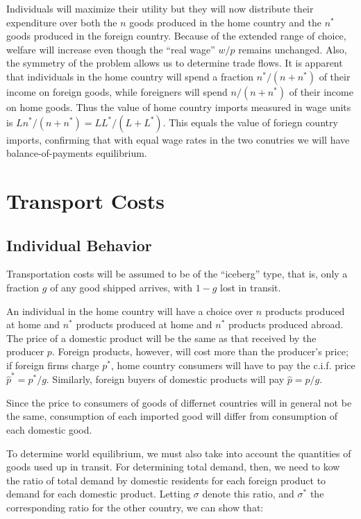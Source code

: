 Individuals will maximize their utility but they will now distribute their expenditure over both the $n$ goods produced in the home country and the $n^*$ goods produced in the foreign country. Because of the extended range of choice, welfare will increase even though the ``real wage'' $w/p$ remains unchanged. Also, the symmetry of the problem allows us to determine trade flows. It is apparent that individuals in the home country will spend a fraction $n^* / (n + n^*)$ of their income on foreign goods, while foreigners will spend $n/(n + n^*)$ of their income on home goods. Thus the value of home country imports measured in wage units is $Ln^* / (n + n^*) = LL^* / (L + L^*)$. This equals the value of foriegn country imports, confirming that with equal wage rates in the two conutries we will have balance-of-payments equilibrium.

\section{Transport Costs}

\subsection{Individual Behavior}

Transportation costs will be assumed to be of the ``iceberg'' type, that is, only a fraction $g$ of any good shipped arrives, with $1 - g$ lost in transit.

An individual in the home country will have a choice over $n$ products produced at home and $n^*$ products produced at home and $n^*$ products produced abroad. The price of a domestic product will be the same as that received by the producer $p$. Foreign products, however, will cost more than the producer's price; if foreign firms charge $p^*$, home country consumers will have to pay the c.i.f. price $\hat{p}^* = p^* / g$. Similarly, foreign buyers of domestic products will pay $\hat{p} = p / g$.

Since the price to consumers of goods of differnet countries will in general not be the same, consumption of each imported good will differ from consumption of each domestic good.

To determine world equilibrium, we must also take into account the quantities of goods used up in transit. For determining total demand, then, we need to kow the ratio of total demand by domestic residents for each foreign product to demand for each domestic product. Letting $\sigma$ denote this ratio, and $\sigma^*$ the corresponding ratio for the other country, we can show that:

